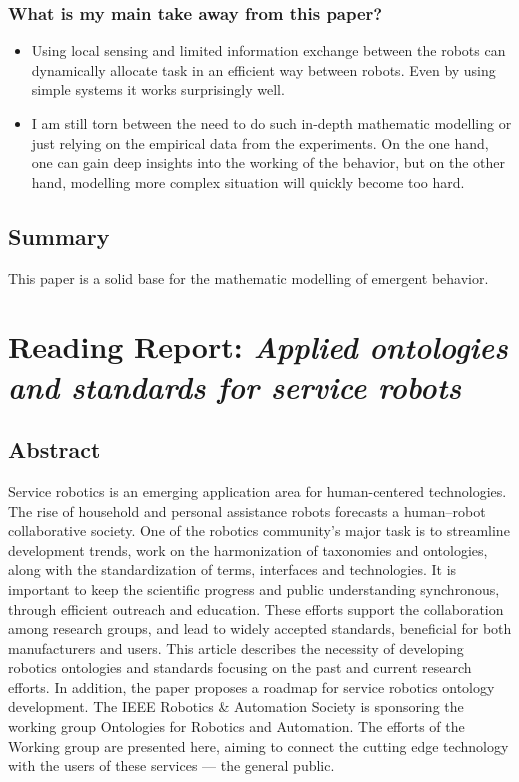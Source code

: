     \subsubsection*{What is my main take away from this paper?}
    \begin{itemize}
        \item Using local sensing and limited  information exchange between the robots can dynamically allocate task in an efficient way between robots. Even by using simple systems it works surprisingly well.
        \item I am still torn between the need to do such in-depth mathematic modelling or just relying on the empirical data from the experiments. On the one hand, one can gain deep insights into the working of the behavior, but on the other hand, modelling more complex situation will quickly become too hard.
    \end{itemize}
    
    \subsection*{Summary}
    This paper is a solid base for the mathematic modelling of emergent behavior.  


    \newpage
    
    \section{Reading Report: \emph{Applied ontologies and standards for service robots}}
    \label{sec:Haidegger2013}
    \cite{Haidegger2013}
    
    \subsection*{Abstract}
    Service robotics is an emerging application area for human-centered technologies. The rise of household
    and personal assistance robots forecasts a human–robot collaborative society. One of the robotics community’s major task is to streamline development trends, work on the harmonization of taxonomies and
    ontologies, along with the standardization of terms, interfaces and technologies. It is important to keep
    the scientific progress and public understanding synchronous, through efficient outreach and education.
    These efforts support the collaboration among research groups, and lead to widely accepted standards,
    beneficial for both manufacturers and users. This article describes the necessity of developing robotics ontologies and standards focusing on the past and current research efforts. In addition, the paper proposes a
    roadmap for service robotics ontology development. The IEEE Robotics \& Automation Society is sponsoring
    the working group Ontologies for Robotics and Automation. The efforts of the Working group are presented
    here, aiming to connect the cutting edge technology with the users of these services — the general public.
    
